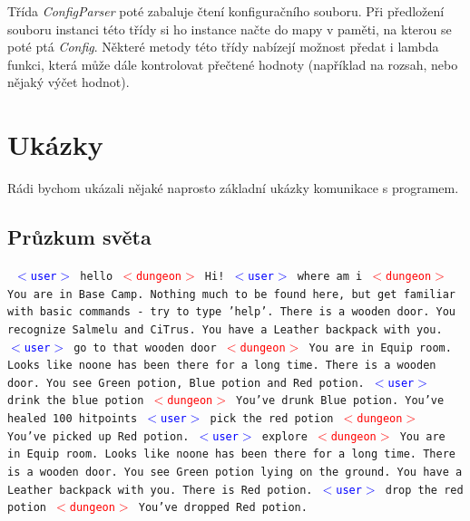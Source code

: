 \documentclass[11pt, a4paper]{article}
\def\class#1{\emph{#1}}
\newenvironment{example}%
{\smallskip\noindent\ignorespaces\obeylines\tt}%
{\smallskip\par\noindent
\ignorespacesafterend}
\def\user{\textcolor{blue}{$<$user$>$ }}
\def\dung{\textcolor{red}{$<$dungeon$>$ }}
\begin{document}
Třída \class{ConfigParser} poté zabaluje čtení konfiguračního souboru. Při předložení souboru instanci této třídy si ho instance načte do mapy v paměti, na kterou se poté ptá \class{Config}. Některé metody této třídy nabízejí možnost předat i lambda funkci, která může dále kontrolovat přečtené hodnoty (například na rozsah, nebo nějaký výčet hodnot).

\section{Ukázky}

Rádi bychom ukázali nějaké naprosto základní ukázky komunikace s programem.
\subsection{Průzkum světa}

\begin{example}
\user hello
\dung Hi!
\user where am i
\dung You are in Base Camp. Nothing much to be found here, but get
familiar with basic commands - try to type 'help'. There is a wooden
door. You recognize Salmelu and CiTrus. You have a Leather backpack 
with you.
\user go to that wooden door
\dung You are in Equip room. Looks like noone has been there for 
a long time. There is a wooden door. You see Green potion, Blue potion 
and Red potion. 
\user drink the blue potion
\dung You've drunk Blue potion. You've healed 100 hitpoints
\user pick the red potion
\dung You've picked up Red potion.
\user explore
\dung You are in Equip room. Looks like noone has been there for 
a long time. There is a wooden door. You see Green potion lying on the 
ground. You have a Leather backpack with you. There is Red potion.
\user drop the red potion
\dung You've dropped Red potion. 
\end{example}
\end{document}

